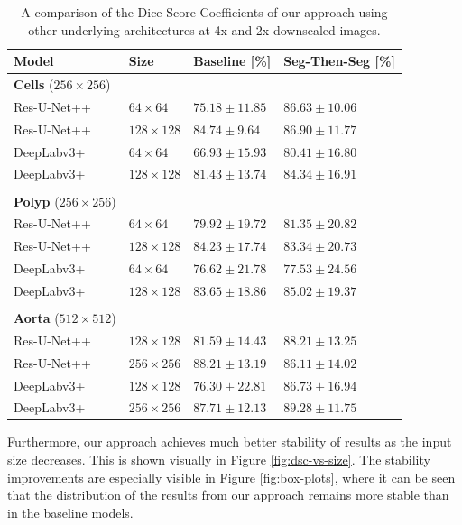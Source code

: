 \begin{table}[t!]
\caption{A comparison of the Dice Score Coefficients of our approach using other underlying architectures at 4x and 2x downscaled images.\label{tab:other-sota}}
		\begin{tabularx}{\textwidth}{lCCC}
			\textbf{Model} & \textbf{Size} & \textbf{Baseline [\%]} & \textbf{Seg-Then-Seg [\%]}\\
\toprule
\textbf{Cells} ($256 \times 256$) & & & \\
\midrule
Res-U-Net++ & $64 \times 64$ & $75.18 \pm 11.85$ & $86.63 \pm 10.06$ \\
Res-U-Net++ & $128 \times 128$ & $84.74 \pm 9.64$ & $86.90 \pm 11.77$ \\
\midrule
DeepLabv3+ & $64 \times 64$ & $66.93 \pm 15.93$ & $80.41 \pm 16.80$ \\
DeepLabv3+ & $128 \times 128$ & $81.43 \pm 13.74$ & $84.34 \pm 16.91$ \\
\bottomrule \\
\toprule
\textbf{Polyp} ($256 \times 256$) & & & \\
\midrule
Res-U-Net++ & $64 \times 64$ & $79.92 \pm 19.72$ & $81.35 \pm 20.82$ \\
Res-U-Net++ & $128 \times 128$ & $84.23 \pm 17.74$ & $83.34 \pm 20.73$ \\
\midrule
DeepLabv3+ & $64 \times 64$ & $76.62 \pm 21.78$ & $77.53 \pm 24.56$ \\
DeepLabv3+ & $128 \times 128$ & $83.65 \pm 18.86$ & $85.02 \pm 19.37$ \\
\bottomrule \\
\toprule
\textbf{Aorta} ($512 \times 512$) & & & \\
\midrule
Res-U-Net++ & $128 \times 128$ & $81.59 \pm 14.43$ & $88.21 \pm 13.25$ \\
Res-U-Net++ & $256 \times 256$ & $88.21 \pm 13.19$ & $86.11 \pm 14.02$ \\
\midrule
DeepLabv3+ & $128 \times 128$ & $76.30 \pm 22.81$ & $86.73 \pm 16.94$ \\
DeepLabv3+ & $256 \times 256$ & $87.71 \pm 12.13$ & $89.28 \pm 11.75$ \\
\end{tabularx}
\end{table}

Furthermore, our approach achieves much better stability of results as the input size decreases. This is shown visually in Figure \ref{fig:dsc-vs-size}. The stability improvements are especially visible in Figure \ref{fig:box-plots}, where it can be seen that the distribution of the results from our approach remains more stable than in the baseline models.


